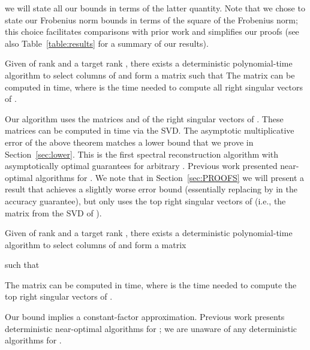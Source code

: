 we will state all our bounds in terms of the latter quantity. Note that we chose to state our Frobenius norm bounds in terms of the square of the Frobenius norm; this choice facilitates comparisons with prior work and simplifies our proofs (see also Table~\ref{table:results} for a summary of our results).
\begin{theorem}
\label{theorem:intro1}
Given  of rank \math{\rho}
and a target rank ,
there exists a deterministic polynomial-time algorithm to
select  columns of \math{\matA} and form a matrix
 such that
The matrix  can be computed in
 time, where  is the time needed to compute all  right singular vectors of .
\end{theorem}


Our algorithm uses
 the matrices  and  of the right singular vectors of . These matrices can be computed in  time via the SVD. The asymptotic multiplicative error of the above theorem matches a lower bound that we prove in Section~\ref{sec:lower}. This is the first spectral reconstruction algorithm with asymptotically optimal guarantees for arbitrary . Previous work presented near-optimal algorithms for  \cite{GE96}. We note that in Section~\ref{sec:PROOFS} we will present a result that achieves a slightly worse error bound (essentially replacing  by  in the accuracy guarantee), but only uses the top  right singular vectors of  (i.e., the matrix  from the SVD of ).

\begin{theorem}
\label{theorem:intro2}
Given  of rank  and a target rank ,
there exists a deterministic
polynomial-time algorithm to
select  columns of \math{\matA} and form a matrix

such that

The matrix  can be computed in
 time, where  is the time needed to compute the top  right singular vectors of .
\end{theorem}


Our bound implies a constant-factor approximation.
Previous work presents deterministic near-optimal algorithms for  \cite{DR10}; we are unaware of any deterministic algorithms for .

